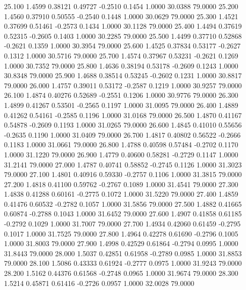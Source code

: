   25.100   1.4599   0.38121   0.49727  -0.2510   0.1454   1.0000  30.0388  79.0000
  25.200   1.4560   0.37910   0.50555  -0.2540   0.1448   1.0000  30.0629  79.0000
  25.300   1.4521   0.37699   0.51461  -0.2573   0.1434   1.0000  30.1128  79.0000
  25.400   1.4494   0.37619   0.52315  -0.2605   0.1403   1.0000  30.2285  79.0000
  25.500   1.4499   0.37710   0.52868  -0.2621   0.1359   1.0000  30.3954  79.0000
  25.600   1.4525   0.37834   0.53177  -0.2627   0.1312   1.0000  30.5716  79.0000
  25.700   1.4574   0.37967   0.53231  -0.2621   0.1269   1.0000  30.7352  79.0000
  25.800   1.4636   0.38194   0.53178  -0.2609   0.1243   1.0000  30.8348  79.0000
  25.900   1.4688   0.38514   0.53245  -0.2602   0.1231   1.0000  30.8817  79.0000
  26.000   1.4757   0.39011   0.53172  -0.2587   0.1219   1.0000  30.9257  79.0000
  26.100   1.4874   0.40276   0.52689  -0.2551   0.1206   1.0000  30.9776  79.0000
  26.300   1.4899   0.41267   0.53501  -0.2565   0.1197   1.0000  31.0095  79.0000
  26.400   1.4889   0.41262   0.54161  -0.2585   0.1196   1.0000  31.0168  79.0000
  26.500   1.4870   0.41167   0.54878  -0.2609   0.1193   1.0000  31.0265  79.0000
  26.600   1.4845   0.41010   0.55656  -0.2635   0.1190   1.0000  31.0409  79.0000
  26.700   1.4817   0.40802   0.56522  -0.2666   0.1183   1.0000  31.0661  79.0000
  26.800   1.4788   0.40598   0.57484  -0.2702   0.1170   1.0000  31.1220  79.0000
  26.900   1.4779   0.40600   0.58281  -0.2729   0.1147   1.0000  31.2141  79.0000
  27.000   1.4787   0.40741   0.58852  -0.2745   0.1126   1.0000  31.3023  79.0000
  27.100   1.4801   0.40916   0.59330  -0.2757   0.1106   1.0000  31.3815  79.0000
  27.200   1.4818   0.41100   0.59762  -0.2767   0.1089   1.0000  31.4541  79.0000
  27.300   1.4838   0.41288   0.60161  -0.2775   0.1072   1.0000  31.5220  79.0000
  27.400   1.4859   0.41476   0.60532  -0.2782   0.1057   1.0000  31.5856  79.0000
  27.500   1.4882   0.41665   0.60874  -0.2788   0.1043   1.0000  31.6452  79.0000
  27.600   1.4907   0.41858   0.61185  -0.2792   0.1029   1.0000  31.7007  79.0000
  27.700   1.4934   0.42060   0.61459  -0.2795   0.1017   1.0000  31.7525  79.0000
  27.800   1.4964   0.42278   0.61690  -0.2796   0.1005   1.0000  31.8003  79.0000
  27.900   1.4998   0.42529   0.61864  -0.2794   0.0995   1.0000  31.8443  79.0000
  28.000   1.5037   0.42851   0.61958  -0.2789   0.0985   1.0000  31.8853  79.0000
  28.100   1.5086   0.43333   0.61924  -0.2777   0.0975   1.0000  31.9243  79.0000
  28.200   1.5162   0.44376   0.61568  -0.2748   0.0965   1.0000  31.9674  79.0000
  28.300   1.5214   0.45871   0.61416  -0.2726   0.0957   1.0000  32.0028  79.0000
